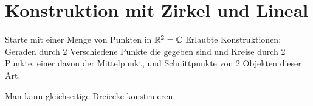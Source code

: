 \section{Konstruktion mit Zirkel und Lineal}
Starte mit einer Menge von Punkten in \(\mathbb{R}^2=\mathbb{C}\)
Erlaubte Konstruktionen: Geraden durch 2 Verschiedene Punkte die gegeben sind und Kreise durch 2 Punkte, einer davon der Mittelpunkt, und Schnittpunkte von 2 Objekten dieser Art.
\begin{Bsp}
	Man kann gleichseitige Dreiecke konstruieren.
	\begin{center}\end{center}
\end{Bsp}
